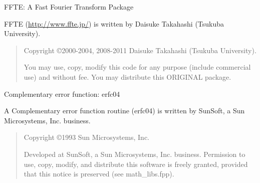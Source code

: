 \documentclass[a4paper,11pt,oneside,english]{sphinxmanual}
\begin{document}
%
%
%
%
%
%
%

\vspace{2ex}

{\large FFTE: A Fast Fourier Transform Package}

FFTE (\url{http://www.ffte.jp/}) is written by Daisuke Takahashi (Tsukuba
University). 

\begin{quote}
  Copyright \copyright 2000-2004, 2008-2011 Daisuke Takahashi (Tsukuba
  University). 

  You may use, copy, modify this code for any purpose (include
  commercial use) and without fee. You may distribute this ORIGINAL
  package. 
\end{quote}

\vspace{2ex}

{\large Complementary error function: erfc04}

A Complementary error function routine (erfc04) is written by SunSoft, 
a Sun Microsystems, Inc. business. 

\begin{quote}
  Copyright \copyright 1993 Sun Microsystems, Inc.

  Developed at SunSoft, a Sun Microsystems, Inc. business. 
  Permission to use, copy, modify, and distribute this 
  software is freely granted, provided that this notice 
  is preserved (see math\_libs.fpp).
\end{quote}
\end{document}
